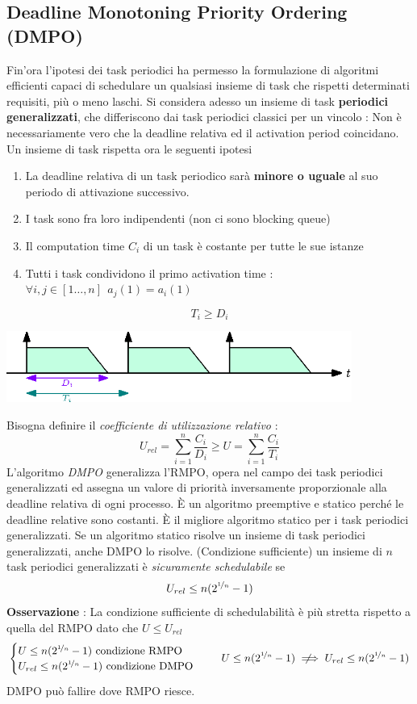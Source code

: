 \documentclass[10pt, letterpaper]{report}
\begin{document}
\subsection{Deadline Monotoning Priority Ordering (DMPO)}
Fin'ora l'ipotesi dei task periodici ha permesso la formulazione di algoritmi efficienti capaci 
di schedulare un qualsiasi insieme di task che rispetti determinati requisiti, più o meno laschi. \acc 
Si considera adesso un insieme di task \textbf{periodici generalizzati}, che differiscono dai task periodici 
classici per un vincolo : Non è necessariamente vero che la deadline relativa ed il activation period coincidano.
Un insieme di task rispetta ora le seguenti ipotesi
\begin{enumerate}
    \item La deadline relativa di un task periodico sarà \textbf{minore o uguale} al suo periodo di attivazione successivo.
    \item I task sono fra loro indipendenti (non ci sono blocking queue)
    \item Il computation time $C_i$ di un task è costante per tutte le sue istanze 
    \item Tutti i task condividono il primo activation time : $\forall i,j\in[1\dots, n] \ \ a_j(1)=a_i(1)$
\end{enumerate}
$$ T_i\ge D_i$$\begin{center}
    \includegraphics[width=0.85\textwidth ]{images/periodicoGeneralizzato.eps}
\end{center}
Bisogna definire il \textit{coefficiente di utilizzazione relativo} :
$$ U_{rel}=\sum_{i=1}^{n}\frac{C_i}{D_i}\ge  U=\sum_{i=1}^{n}\frac{C_i}{T_i}$$
L'algoritmo \textit{DMPO} generalizza l'RMPO, opera nel campo dei task periodici generalizzati 
ed assegna un valore di priorità inversamente proporzionale 
alla deadline relativa di ogni processo. È un algoritmo preemptive e statico perché le deadline relative sono 
costanti.\acc 
{} È il migliore algoritmo statico per i task periodici generalizzati. \acc 
{} Se un algoritmo statico risolve un insieme di task periodici generalizzati, anche DMPO lo risolve.\acc 
{} (Condizione sufficiente) un insieme di $n$ task periodici generalizzati è \textit{sicuramente schedulabile} se 
$$ U_{rel}\le n(2^{\nicefrac{1}{n}}-1)$$
\textbf{Osservazione} : La condizione sufficiente di schedulabilità è più stretta rispetto 
a quella del RMPO dato che $U\le U_{rel}$ $$\begin{cases}
    U\le n(2^{\nicefrac{1}{n}}-1) \text{ condizione RMPO }\\ 
    U_{rel}\le n(2^{\nicefrac{1}{n}}-1) \text{ condizione DMPO }
\end{cases}  \ \ \ U\le n(2^{\nicefrac{1}{n}}-1) \notimplies U_{rel} \le n(2^{\nicefrac{1}{n}}-1)$$
DMPO può fallire dove RMPO riesce.
\end{document}
